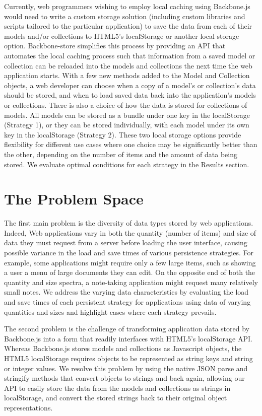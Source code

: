 \documentclass[12pt]{article}
\begin{document}
Currently, web programmers wishing to employ local caching using Backbone.js would need to write a custom storage solution (including custom libraries and scripts tailored to the particular application) to save the data from each of their models and/or collections to HTML5's localStorage or another local storage option. Backbone-store simplifies this process by providing an API that automates the local caching process such that information from a saved model or collection can be reloaded into the
models and collections the next time the web application starts. With a few new
methods added to the Model and Collection objects, a web developer can choose
when a copy of a model's or collection's data should be stored, and when to
load saved data back into the application's models or collections. There is
also a choice of how the data is stored for collections of models. All models
can be stored as a bundle under one key in the localStorage (Strategy 1), or they can be
stored individually, with each model under its own key in the localStorage (Strategy 2).
These two local storage options provide flexibility for different use cases where one choice may be
significantly better than the other, depending on the number of items and
the amount of data being stored. We evaluate optimal conditions for each strategy in the Results section.

\section{The Problem Space}

The first main problem is the diversity of data types stored by web applications. Indeed, Web applications vary in both the quantity (number of items) and size of data they must request from a
server before loading the user interface, causing possible variance in the load and save times of various persistence strategies.  For example, some applications might require only a few
large items, such as showing a user a menu of large documents they can edit. On
the opposite end of both the quantity and size spectra, a note-taking application might request many
relatively small notes. We address the varying data characteristics by evaluating the load and save times of each persistent strategy for applications using data of varying quantities and sizes and highlight cases where each strategy prevails.

The second problem is the challenge of transforming application data stored by Backbone.js into a form that readily interfaces with HTML5's localStorage API. Whereas Backbone.js stores models and collections as Javascript objects, the HTML5 localStorage requires objects to be represented as string keys and string or integer values. We resolve this problem by using the native JSON parse and stringify methods that convert objects to strings and back again, allowing our API to easily
store the data from the models and collections as strings in localStorage, and
convert the stored strings back to their original object representations.
\end{document}
